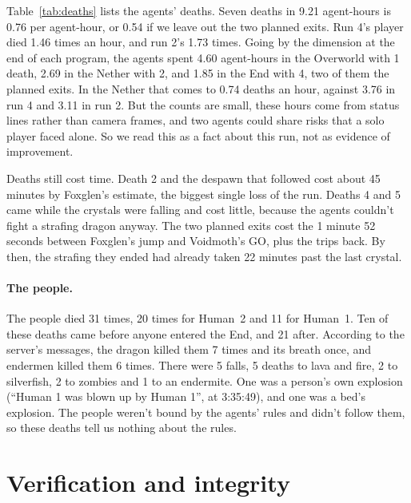 \documentclass[11pt,a4paper]{article}
\begin{document}
Table~\ref{tab:deaths} lists the agents' deaths. Seven deaths in 9.21 agent-hours is 0.76 per agent-hour, or 0.54 if we leave out the two planned exits. Run 4's player died 1.46 times an hour, and run 2's 1.73 times. Going by the dimension at the end of each program, the agents spent 4.60 agent-hours in the Overworld with 1 death, 2.69 in the Nether with 2, and 1.85 in the End with 4, two of them the planned exits. In the Nether that comes to 0.74 deaths an hour, against 3.76 in run 4 and 3.11 in run 2. But the counts are small, these hours come from status lines rather than camera frames, and two agents could share risks that a solo player faced alone. So we read this as a fact about this run, not as evidence of improvement.

Deaths still cost time. Death 2 and the despawn that followed cost about 45 minutes by Foxglen's estimate, the biggest single loss of the run. Deaths 4 and 5 came while the crystals were falling and cost little, because the agents couldn't fight a strafing dragon anyway. The two planned exits cost the 1 minute 52 seconds between Foxglen's jump and Voidmoth's GO, plus the trips back. By then, the strafing they ended had already taken 22 minutes past the last crystal.

\paragraph{The people.} The people died 31 times, 20 times for Human~2 and 11 for Human~1. Ten of these deaths came before anyone entered the End, and 21 after. According to the server's messages, the dragon killed them 7 times and its breath once, and endermen killed them 6 times. There were 5 falls, 5 deaths to lava and fire, 2 to silverfish, 2 to zombies and 1 to an endermite. One was a person's own explosion (``Human 1 was blown up by Human 1'', at 3:35:49), and one was a bed's explosion. The people weren't bound by the agents' rules and didn't follow them, so these deaths tell us nothing about the rules.

\section{Verification and integrity}
\label{sec:verify}
\end{document}

